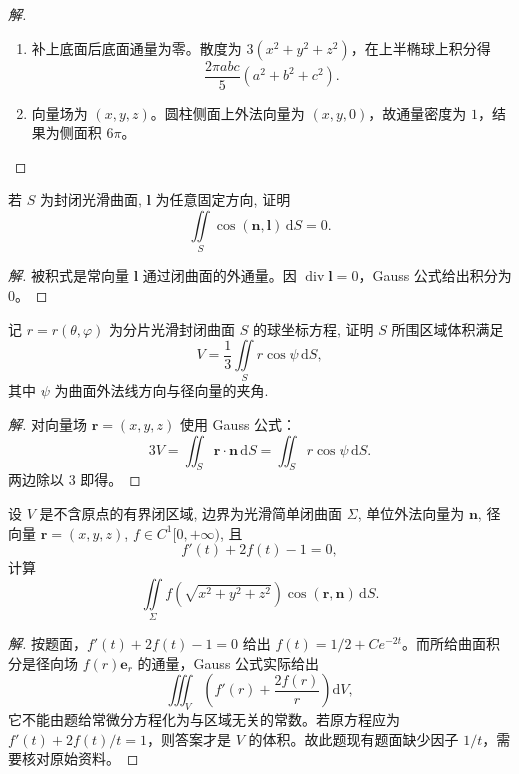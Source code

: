 \documentclass[../../数学分析培优讲义(答案版).tex]{subfiles}
\begin{document}
\begin{proof}[解]
\begin{enumerate}[label=(\arabic*)]
\item 补上底面后底面通量为零。散度为 $3(x^2+y^2+z^2)$，在上半椭球上积分得
\[
\dfrac{2\pi abc}{5}(a^2+b^2+c^2).
\]
\item 向量场为 $(x,y,z)$。圆柱侧面上外法向量为 $(x,y,0)$，故通量密度为 $1$，结果为侧面积 $6\pi$。
\end{enumerate}
\end{proof}

\begin{example}
若 $S$ 为封闭光滑曲面, $\bm l$ 为任意固定方向, 证明
\[
    \iint\limits_S\cos(\bm n,\bm l)\,\mathrm{d}S=0.
\]
\end{example}

\begin{proof}[解]
被积式是常向量 $\bm l$ 通过闭曲面的外通量。因 $\operatorname{div}\bm l=0$，Gauss 公式给出积分为 $0$。
\end{proof}

\begin{example}
记 $r=r(\theta,\varphi)$ 为分片光滑封闭曲面 $S$ 的球坐标方程, 证明 $S$ 所围区域体积满足
\[
    V=\dfrac{1}{3}\iint\limits_Sr\cos\psi\,\mathrm{d}S,
\]
其中 $\psi$ 为曲面外法线方向与径向量的夹角.
\end{example}

\begin{proof}[解]
对向量场 $\bm r=(x,y,z)$ 使用 Gauss 公式：
\[
3V=\iint_S\bm r\cdot\bm n\,\mathrm{d}S
=\iint_Sr\cos\psi\,\mathrm{d}S.
\]
两边除以 $3$ 即得。
\end{proof}

\begin{example}
设 $V$ 是不含原点的有界闭区域, 边界为光滑简单闭曲面 $\Sigma$, 单位外法向量为 $\bm n$, 径向量 $\bm r=(x,y,z)$, $f\in C^1\lbrack0,+\infty)$, 且
\[
    f'(t)+2f(t)-1=0,
\]
计算
\[
    \iint\limits_\Sigma f\left(\sqrt{x^2+y^2+z^2}\right)\cos(\bm r,\bm n)\,\mathrm{d}S.
\]
\end{example}

\begin{proof}[解]
按题面，$f'(t)+2f(t)-1=0$ 给出 $f(t)=1/2+Ce^{-2t}$。而所给曲面积分是径向场 $f(r)\bm e_r$ 的通量，Gauss 公式实际给出
\[
\iiint_V\left(f'(r)+\dfrac{2f(r)}{r}\right)\mathrm{d}V,
\]
它不能由题给常微分方程化为与区域无关的常数。若原方程应为 $f'(t)+2f(t)/t=1$，则答案才是 $V$ 的体积。故此题现有题面缺少因子 $1/t$，需要核对原始资料。
\end{proof}
\end{document}
